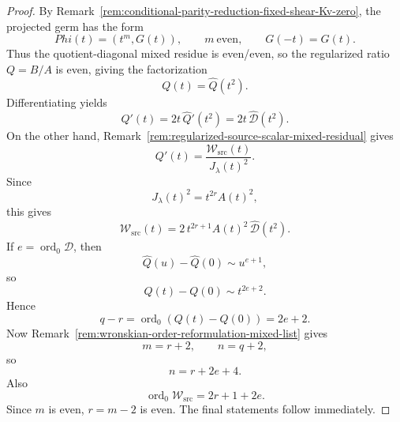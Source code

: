 \documentclass[11pt,a4paper]{amsart}
\def\Phi{Phi}%
\theoremstyle{plain}
\theoremstyle{definition}
\begin{document}
\begin{proof}
By Remark~\ref{rem:conditional-parity-reduction-fixed-shear-Kv-zero}, the
projected germ has the form
\[
\Phi(t)=(t^m,G(t)),
\qquad
m\ \text{even},
\qquad
G(-t)=G(t).
\]
Thus the quotient-diagonal mixed residue is even/even, so the regularized ratio
$Q=B/A$ is even, giving the factorization
\[
Q(t)=\widehat Q(t^2).
\]
Differentiating yields
\[
Q'(t)=2t\,\widehat Q'(t^2)=2t\,\widehat{\mathcal D}(t^2).
\]
On the other hand,
Remark~\ref{rem:regularized-source-scalar-mixed-residual} gives
\[
Q'(t)=\frac{\mathcal W_{\mathrm{src}}(t)}{J_\lambda(t)^2}.
\]
Since
\[
J_\lambda(t)^2=t^{2r}A(t)^2,
\]
this gives
\[
\mathcal W_{\mathrm{src}}(t)
=
2\,t^{2r+1}A(t)^2\,\widehat{\mathcal D}(t^2).
\]
If $e=\operatorname{ord}_0\widehat{\mathcal D}$, then
\[
\widehat Q(u)-\widehat Q(0)\sim u^{e+1},
\]
so
\[
Q(t)-Q(0)\sim t^{2e+2}.
\]
Hence
\[
q-r=\operatorname{ord}_0(Q(t)-Q(0))=2e+2.
\]
Now
Remark~\ref{rem:wronskian-order-reformulation-mixed-list} gives
\[
m=r+2,
\qquad
n=q+2,
\]
so
\[
n=r+2e+4.
\]
Also
\[
\operatorname{ord}_0\mathcal W_{\mathrm{src}}=2r+1+2e.
\]
Since $m$ is even, $r=m-2$ is even. The final statements follow immediately.
\end{proof}
\end{document}
